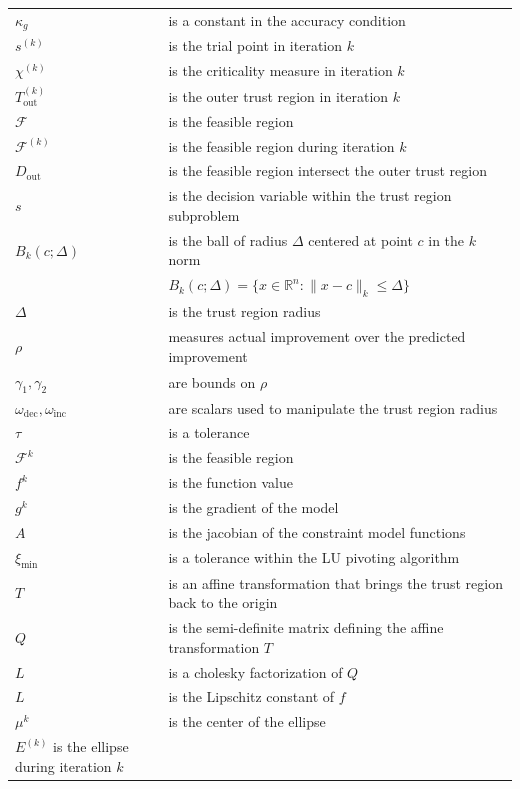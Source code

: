\documentclass{article}
\theoremstyle{case}
\newcommand{\sk}{{{s}^{(k)}}}
\newcommand{\outertrk}{{T_{\text{out}}^{(k)}}}
\newcommand{\feasible}{{\mathcal F}}
\newcommand{\feasiblek}{{\mathcal F^{(k)}}}
\newcommand{\ellipsek}{{E^{(k)}}}
\newcommand{\chik}{{\chi^{(k)}}}
\newcommand{\outerfritr}{D_{\text{out}}}
\begin{document}
\begin{longtable}{| p{} | p{} |}
$\kappa_{g}$ & is a constant in the accuracy condition \\
$\sk$ & is the trial point in iteration $k$ \\
$\chik$ & is the criticality measure in iteration $k$ \\
$\outertrk$ & is the outer trust region in iteration $k$ \\
$\feasible$ & is the feasible region \\
$\feasiblek$ & is the feasible region during iteration $k$ \\
$\outerfritr$ & is the feasible region intersect the outer trust region \\
$s$ & is the decision variable within the trust region subproblem \\
$B_k(c; \Delta)$ & is the ball of radius $\Delta$ centered at point $c$ in the $k$ norm\\
& $B_k(c;\Delta) = \{ x \in \mathbb{R}^n : \| x - c\|_k \le \Delta \}$ \\
$\Delta$ & is the trust region radius \\
$\rho$ & measures actual improvement over the predicted improvement \\
$\gamma_1, \gamma_2$ &  are bounds on $\rho$ \\
$\omega_{\text{dec}}, \omega_{\text{inc}}$ & are scalars used to manipulate the trust region radius \\
$\tau$ & is a tolerance \\
$\mathcal{F}^k$ & is the feasible region \\
$f^k$ & is the function value \\
$g^k$ & is the gradient of the model \\
$A$ & is the jacobian of the constraint model functions \\
$\xi_{\text{min}}$ & is a tolerance within the LU pivoting algorithm \\
$T$ & is an affine transformation that brings the trust region back to the origin \\
$Q$ & is the semi-definite matrix defining the affine transformation $T$ \\
$L$ & is a cholesky factorization of $Q$ \\
$L$ & is the Lipschitz constant of $f$ \\
$\mu^k$ & is the center of the ellipse \\
$\ellipsek$ is the ellipse during iteration $k$ \\

\end{longtable}
\end{document}
